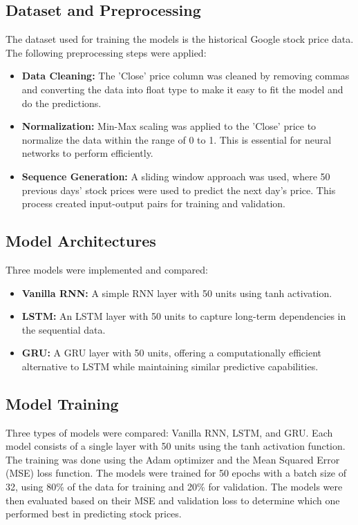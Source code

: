 \documentclass[10pt,twocolumn,a4paper]{article}
\begin{document}
\subsection{Dataset and Preprocessing}
The dataset used for training the models is the historical Google stock price data. The following preprocessing steps were applied:
\begin{itemize}
    \item \textbf{Data Cleaning:} The 'Close' price column was cleaned by removing commas and converting the data into float type to make it easy to fit the model and do the predictions.
    \item \textbf{Normalization:} Min-Max scaling was applied to the 'Close' price to normalize the data within the range of 0 to 1. This is essential for neural networks to perform efficiently.
    \item \textbf{Sequence Generation:} A sliding window approach was used, where 50 previous days' stock prices were used to predict the next day's price. This process created input-output pairs for training and validation.
\end{itemize}

\subsection{Model Architectures}
Three models were implemented and compared:
\begin{itemize}
    \item \textbf{Vanilla RNN:} A simple RNN layer with 50 units using tanh activation.
    \item \textbf{LSTM:} An LSTM layer with 50 units to capture long-term dependencies in the sequential data.
    \item \textbf{GRU:} A GRU layer with 50 units, offering a computationally efficient alternative to LSTM while maintaining similar predictive capabilities.
\end{itemize}

\subsection{Model Training}
Three types of models were compared: Vanilla RNN, LSTM, and GRU. Each model consists of a single layer with 50 units using the tanh activation function. The training was done using the Adam optimizer and the Mean Squared Error (MSE) loss function. The models were trained for 50 epochs with a batch size of 32, using 80\% of the data for training and 20\% for validation. The models were then evaluated based on their MSE and validation loss to determine which one performed best in predicting stock prices.
\end{document}
